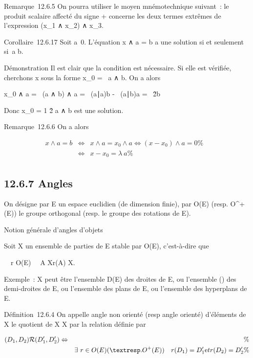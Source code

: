 \documentclass[]{article}
\begin{document}
Remarque~12.6.5 On pourra utiliser le moyen mnémotechnique suivant~: le
produit scalaire affecté du signe + concerne les deux termes extrêmes de
l'expression (x_1 ∧ x_2) ∧ x_3.

Corollaire~12.6.17 Soit a\neq~0. L'équation x ∧ a
= b a une solution si et seulement si~a \bot b.

Démonstration Il est clair que la condition est nécessaire. Si elle est
vérifiée, cherchons x sous la forme x_0 = \lambda~a ∧ b. On a alors

x_0 ∧ a = \lambda~(a ∧ b) ∧ a = \lambda~(a∣a)b -
\lambda~(a∣b)a =
\lambda~\a\^2b

Donc x_0 = 1 \over
\a\^2 a ∧
b est une solution.

Remarque~12.6.6 On a alors

\begin{align*} x ∧ a = b&
\Leftrightarrow & x ∧ a = x_0 ∧ a
\Leftrightarrow (x - x_0) ∧ a = 0\%&
\\ & \Leftrightarrow & x -
x_0 = \lambda~a \%& \\
\end{align*}

\subsection{12.6.7 Angles}

On désigne par E un espace euclidien (de dimension finie), par O(E)
(resp. O^+(E)) le groupe orthogonal (resp. le groupe des
rotations de E).

Notion générale d'angles d'objets

Soit X un ensemble de parties de E stable par O(E), c'est-à-dire que

\forall~~r \in O(E)\quad
\forall~~A \in X\quad r(A) \in X.

Exemple~: X peut être l'ensemble D(E) des droites de E, ou l'ensemble
\tildeD() des demi-droites de E, ou l'ensemble des
plans de E, ou l'ensemble des hyperplans de E.

Définition~12.6.4 On appelle angle non orienté (resp angle orienté)
d'éléments de X le quotient de X \times X par la relation  définie par

\begin{align*}
(D_1,D_2)\mathcal{R}(D_1',D_2')
\Leftrightarrow&& \%& \\
& & \exists~r \in O(E) (\textresp.
O^+(E))\quad r(D_ 1) =
D_1'\text et r(D_2) =
D_2'\%& \\
\end{align*}
\end{document}
